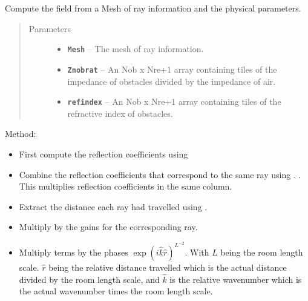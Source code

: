\documentclass[letterpaper,10pt,english]{sphinxmanual}
\begin{document}
\begin{fulllineitems}
\label{index:DictionarySparseMatrix.power_compute}
Compute the field from a Mesh of ray information and the physical   parameters.
\begin{quote}\begin{description}
\item[{Parameters}] \leavevmode\begin{itemize}
\item {} 
\textbf{\texttt{Mesh}} -- The {\hyperref[index:DictionarySparseMatrix.DS]{}} mesh of ray information.

\item {} 
\textbf{\texttt{Znobrat}} -- An Nob x Nre+1 array containing tiles of the impedance     of obstacles divided by the impedance of air.

\item {} 
\textbf{\texttt{refindex}} -- An Nob x Nre+1 array containing tiles of the refractive    index of obstacles.

\end{itemize}

\end{description}\end{quote}

Method:
\begin{itemize}
\item {} 
First compute the reflection coefficients using     

\item {} 
Combine the reflection coefficients that correspond to the same     ray using {\hyperref[index:DictionarySparseMatrix.DS]{}}. . This     multiplies reflection coefficients in the same column.

\item {} 
Extract the distance each ray had travelled using     {\hyperref[index:DictionarySparseMatrix.DS]{}}. 

\item {} 
Multiply by the gains for the corresponding ray.

\item {} 
Multiply terms by the phases     \(\exp(i\hat{k} \hat{r})^{L^{-2}}\). With \(L\) being     the room length scale. \(\hat{r}\) being the relative distance     travelled which is the actual distance divided by the room length     scale, and \(\hat{k}\) is the relative wavenumber which is the     actual wavenumber times the room length scale.


\end{itemize}
\end{fulllineitems}
\end{document}
